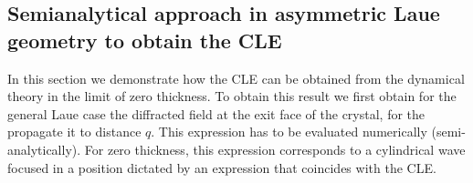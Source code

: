 \documentclass[preprint]{iucr}              %
\newcommand{\inred}[1]{{\color{red}#1}}
\begin{document}



\subsection{Semianalytical approach in \inred{asymmetric} Laue geometry \inred{to obtain the CLE}}
\label{sec:LaueCompatibilityCLE}

\inred{In this section we demonstrate how the CLE can be obtained from the dynamical theory in the limit of zero thickness. To obtain this result we first obtain for the general Laue case the diffracted field at the exit face of the crystal, for the propagate it to distance $q$. This expression has to be evaluated numerically (semi-analytically). For zero thickness, this expression corresponds to a cylindrical wave focused in a position dictated by an expression that coincides with the CLE.}
\end{document}
